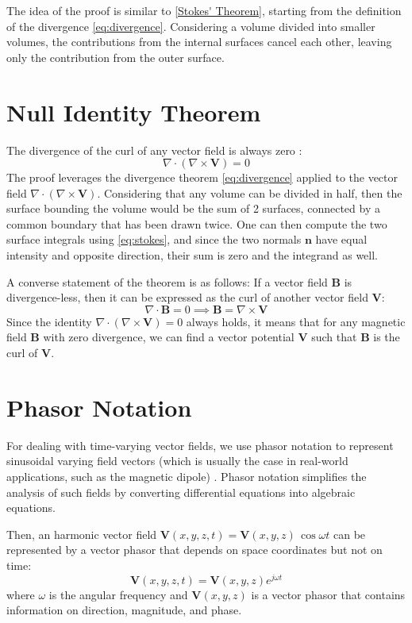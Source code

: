 The idea of the proof is similar to \ref{Stokes' Theorem}, starting from the definition of the divergence \ref{eq:divergence}. Considering a volume divided into smaller volumes, the contributions from the internal surfaces cancel each other, leaving only the contribution from the outer surface.

\section{Null Identity Theorem}
The divergence of the curl of any vector field is always zero \cite{book-magnetism}:
\begin{equation}
\nabla \cdot (\nabla \times \mathbf{V}) = 0 \label{eq:null}
\end{equation}
The proof leverages the divergence theorem \ref{eq:divergence} applied to the vector field \(\nabla \cdot (\nabla \times \mathbf{V})\). Considering that any volume can be divided in half, then the surface bounding the volume would be the sum of 2 surfaces, connected by a common boundary that has been drawn twice. One can then compute the two surface integrals using \ref{eq:stokes}, and since the two normals \(\mathbf{n}\) have equal intensity and opposite direction, their sum is zero and the integrand as well.
\medskip

A converse statement of the theorem is as follows: 
If a vector field \(\mathbf{B}\) is divergence-less,
then it can be expressed as the curl of another vector field \(\mathbf{V}\):
\[
\nabla \cdot \mathbf{B} = 0 \implies \mathbf{B} = \nabla \times \mathbf{V}
\]
Since the identity \(\nabla \cdot (\nabla \times \mathbf{V}) = 0\) always holds, it means that for any magnetic field \(\mathbf{B}\) with zero divergence, we can find a vector potential \(\mathbf{V}\) such that \(\mathbf{B}\) is the curl of \(\mathbf{V}\).

\section{Phasor Notation} \label{Phasor Notation}
For dealing with time-varying vector fields, we use phasor notation to represent sinusoidal varying field vectors (which is usually the case in real-world applications, such as the magnetic dipole) \cite{book-magnetism}. Phasor notation simplifies the analysis of such fields by converting differential equations into algebraic equations.

Then, an harmonic vector field \( \mathbf{V}(x, y, z, t) = \mathbf{V}(x, y, z) \, \cos\omega t\) can be represented by a vector phasor that depends on space coordinates but not on time:
\[
\mathbf{V}(x, y, z, t) = \mathbf{V}(x, y, z) e^{j\omega t}
\]
where \(\omega\) is the angular frequency and \( \mathbf{V}(x, y, z) \) is a vector phasor that contains information on direction, magnitude, and phase.

